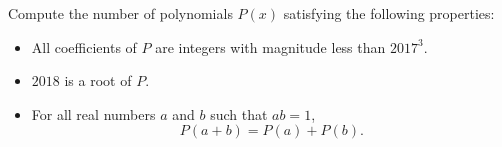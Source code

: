 Compute the number of polynomials $P\left(x\right)$ satisfying the following properties:
\begin{itemize}
    \item All coefficients of $P$ are integers with magnitude less than $2017^3$.
    \item $2018$ is a root of $P$.
    \item For all real numbers $a$ and $b$ such that $ab=1$, \[P\left(a+b\right)=P\left(a\right)+P\left(b\right).\]
\end{itemize}